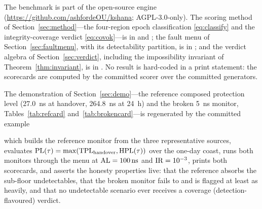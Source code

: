 \label{sec:availability}
The benchmark is part of the open-source  engine
\citep{baweja2026kshana} (\url{https://github.com/ashfordeOU/kshana}; AGPL-3.0-only).
The scoring method of Section~\ref{sec:method}---the four-region epoch
classification \eqref{eq:classify} and the integrity-coverage verdict
\eqref{eq:covok}---is in  and
; the fault menu of Section~\ref{sec:faultmenu},
with its \Cited{} detectability partition, is in ;
and the verdict algebra of Section~\ref{sec:verdict}, including the impossibility
invariant of Theorem~\ref{thm:invariant}, is in .
No result is hard-coded in a print statement: the scorecards are computed by the
committed scorer over the committed generators.

The demonstration of Section~\ref{sec:demo}---the reference composed protection
level (\SI{27.0}{\nano\second} at handover, \SI{264.8}{\nano\second} at
\SI{24}{\hour}) and the broken \SI{5}{\nano\second} monitor, Tables~\ref{tab:refcard}
and~\ref{tab:brokencard}---is regenerated by the committed example
\begin{quote}
\end{quote}
which builds the reference monitor from the three representative sources, evaluates
$\mathrm{PL}(\tau)=\max(\mathrm{TPL}_{\mathrm{handover}},\mathrm{HPL}(\tau))$ over the one-day
coast, runs both monitors through the menu at $\mathrm{AL}=\SI{100}{\nano\second}$ and
$\mathrm{IR}=\num{e-3}$, prints both scorecards, and asserts the honesty properties live:
that the reference absorbs the sub-floor undetectables, that the broken monitor
fails to and is flagged at least as heavily, and that no undetectable scenario ever
receives a coverage (detection-flavoured) verdict.

